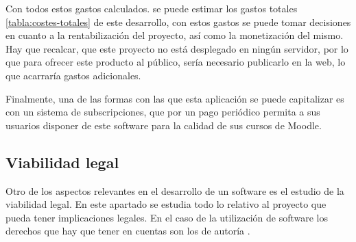 \begin{table}[H]
	\centering
	\caption{Costes de servicios}
\end{table}

Con todos estos gastos calculados. se puede estimar los gastos totales \ref{tabla:costes-totales} de este desarrollo,
con estos gastos se puede tomar decisiones en cuanto a la rentabilización del proyecto, así como la monetización del mismo. Hay que recalcar, que este proyecto no está desplegado en ningún servidor, por lo que para ofrecer este producto al público, sería necesario publicarlo en la web, lo que acarraría gastos adicionales. 

Finalmente, una de las formas con las que esta aplicación se puede capitalizar es con un sistema de subscripciones, que por un pago periódico permita a sus usuarios disponer de este software para la calidad de sus cursos de Moodle.

\begin{table}[H]
	\centering
	\caption{Costes Totales}
\end{table}

\subsection{Viabilidad legal}
Otro de los aspectos relevantes en el desarrollo de un software es el estudio de la viabilidad legal. En este apartado se estudia todo lo relativo al proyecto que pueda tener implicaciones legales. En el caso de la utilización de software los derechos que hay que tener en cuentas son los de autoría \cite{derechos-autoria}. 

